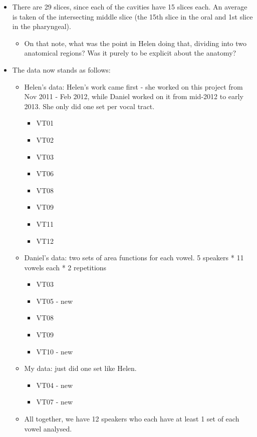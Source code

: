 \documentclass{article}
\begin{document}
\begin{itemize}
    \item There are 29 slices, since each of the cavities have 15 slices each. An average is taken of the intersecting middle slice (the 15th slice in the oral and 1st slice in the pharyngeal).
    \begin{itemize}
        \item On that note, what was the point in Helen doing that, dividing into two anatomical regions? Was it purely to be explicit about the anatomy?
    \end{itemize}
    \item The data now stands as follows:
    \begin{itemize}
        \item Helen's data: Helen's work came first - she worked on this project from Nov 2011 - Feb 2012, while Daniel worked on it from mid-2012 to early 2013. She only did one set per vocal tract.
        \begin{itemize}
            \item VT01
            \item VT02
            \item VT03
            \item VT06
            \item VT08
            \item VT09
            \item VT11
            \item VT12
        \end{itemize}
        \item Daniel's data: two sets of area functions for each vowel. 5 speakers * 11 vowels each * 2 repetitions
        \begin{itemize}
            \item VT03
            \item VT05 - new
            \item VT08
            \item VT09
            \item VT10 - new
        \end{itemize}
        \item My data: just did one set like Helen.
        \begin{itemize}
            \item VT04 - new
            \item VT07 - new
        \end{itemize}
        \item All together, we have 12 speakers who each have at least 1 set of each vowel analysed.

\end{itemize}
\end{itemize}
\end{document}
